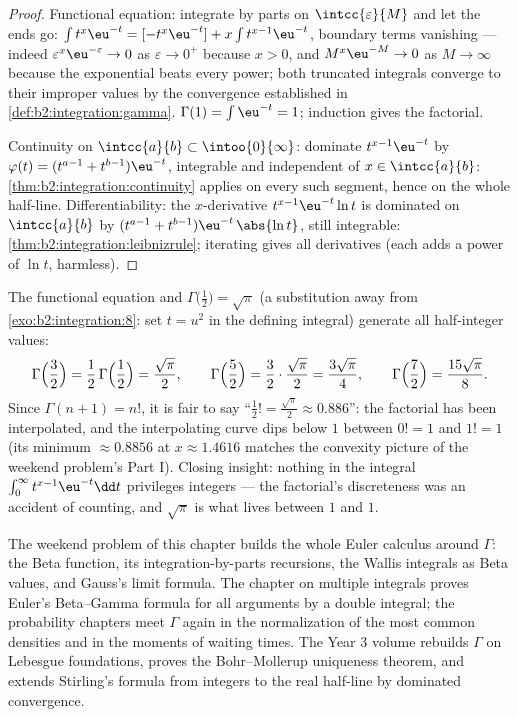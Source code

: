 \begin{proof}
Functional equation: integrate by parts on $\intcc{\varepsilon}{M}$
and let the ends go: $\int t^{x}\eu^{-t} = [-t^x\eu^{-t}] + x\int
t^{x-1}\eu^{-t}$, boundary terms vanishing --- indeed
$\varepsilon^x\eu^{-\varepsilon} \to 0$ as $\varepsilon \to
0^+$ because $x > 0$, and $M^x\eu^{-M} \to 0$ as $M \to \infty$
because the exponential beats every power; both truncated
integrals converge to their improper values by the convergence
established in \cref{def:b2:integration:gamma}. $\Gamma(1) = \int
\eu^{-t} = 1$; induction gives the factorial.

Continuity on $\intcc{a}{b} \subset \intoo{0}{\infty}$: dominate
$t^{x-1}\eu^{-t}$ by $\varphi(t) = (t^{a-1} + t^{b-1})\eu^{-t}$,
integrable and independent of $x \in \intcc{a}{b}$:
\cref{thm:b2:integration:continuity} applies on every such segment,
hence on the whole half-line. Differentiability: the $x$-derivative
$t^{x-1}\eu^{-t}\ln t$ is dominated on $\intcc{a}{b}$ by $(t^{a-1}
+ t^{b-1})\eu^{-t}\,\abs{\ln t}$, still integrable:
\cref{thm:b2:integration:leibnizrule}; iterating gives all
derivatives (each adds a power of $\ln t$, harmless).
\end{proof}

\begin{example}\label{ex:b2:integration:halffactorial}
The functional equation and $\Gamma\bigl(\frac12\bigr) =
\sqrt\pi$ (a substitution away from
\cref{exo:b2:integration:8}: set $t = u^2$ in the defining
integral) generate all half-integer values:
\[
\Gamma\Bigl(\frac32\Bigr) = \frac12\,\Gamma\Bigl(\frac12\Bigr)
= \frac{\sqrt\pi}{2},
\qquad
\Gamma\Bigl(\frac52\Bigr) = \frac32\cdot\frac{\sqrt\pi}{2}
= \frac{3\sqrt\pi}{4},
\qquad
\Gamma\Bigl(\frac72\Bigr) = \frac{15\sqrt\pi}{8} .
\]
Since $\Gamma(n+1) = n!$, it is fair to say ``$\frac12! =
\frac{\sqrt\pi}{2} \approx 0.886$'': the factorial has been
interpolated, and the interpolating curve dips below $1$
between $0! = 1$ and $1! = 1$ (its minimum $\approx 0.8856$ at
$x \approx 1.4616$ matches the convexity picture of the
weekend problem's Part I). Closing insight: nothing in the
integral $\int_0^\infty t^{x-1}\eu^{-t}\dd t$ privileges
integers --- the factorial's discreteness was an accident of
counting, and $\sqrt\pi$ is what lives between $1$ and $1$.
\end{example}

\begin{remark}
The weekend problem of this chapter builds the whole Euler
calculus around $\Gamma$: the Beta function, its integration-by-parts
recursions, the Wallis integrals as Beta values, and Gauss's
limit formula. The chapter on multiple integrals proves Euler's
Beta--Gamma formula for all arguments by a double integral; the
probability chapters meet $\Gamma$ again in the normalization of
the most common densities and in the moments of waiting times.
The Year 3 volume rebuilds $\Gamma$ on Lebesgue foundations,
proves the Bohr--Mollerup uniqueness theorem, and extends
Stirling's formula from integers to the real half-line by
dominated convergence.
\end{remark}

